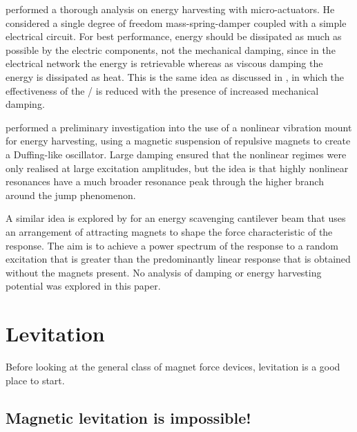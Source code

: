 \textcite{stephen2006} performed a thorough analysis on energy harvesting with micro-actuators. 
He considered a single degree of freedom mass-spring-damper coupled with a simple electrical circuit. 
For best performance, energy should be dissipated as much as possible by the electric components, not the mechanical damping, since in the electrical network the energy is retrievable whereas as viscous damping the energy is dissipated as heat.
This is the same idea as discussed in , in which the effectiveness of the \vibneut/ is reduced with the presence of increased mechanical damping.

\textcite{mann2008} performed a preliminary investigation into the use of a
nonlinear vibration mount for energy harvesting, using a magnetic suspension
of repulsive magnets to create a Duffing-like oscillator. Large damping
ensured that the nonlinear regimes were only realised at large excitation
amplitudes, but the idea is that highly nonlinear resonances have a much
broader resonance peak through the higher branch around the jump phenomenon.

A similar idea is explored by \textcite{shahruz2008} for an energy scavenging
cantilever beam that uses an arrangement of attracting magnets to shape the
force characteristic of the response. The aim is to achieve a power spectrum
of the response to a random excitation that is greater than the predominantly
linear response that is obtained without the magnets present. No analysis of 
damping or energy harvesting potential was explored in this paper.


\section{Levitation}

Before looking at the general class of magnet force devices, levitation is a
good place to start.

\subsection{Magnetic levitation is impossible!}

